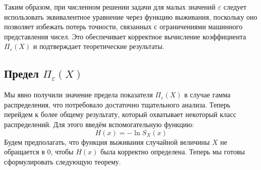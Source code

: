 \documentclass[12pt]{article}
\theoremstyle{plain}
\theoremstyle{definition}
\theoremstyle{remark}
\begin{document}
Таким образом, при численном решении задачи для малых значений $\varepsilon$ следует использовать эквивалентное уравнение через функцию выживания, поскольку оно позволяет избежать потерь точности, связанных с ограничениями машинного представления чисел. Это обеспечивает корректное вычисление коэффициента $\Pi_\varepsilon(X)$ и подтверждает теоретические результаты.

\subsection{Предел $\Pi_\varepsilon(X)$}
Мы явно получили значение предела показателя $\Pi_\varepsilon(X)$ в случае гамма распределения, что потребовало достаточно тщательного анализа. Теперь перейдем к более общему результату, который охватывает некоторый класс распределений. Для этого введём вспомогательную функцию:
\[
    H(x) = -\ln S_X(x)
\]
Будем предполагать, что функция выживания случайной величины $X$ не обращается в 0, чтобы $H(x)$ была корректно определена. Теперь мы готовы сформулировать следующую теорему.
\end{document}
